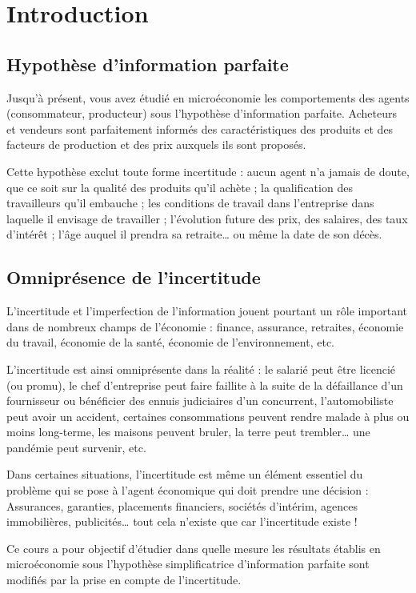 \documentclass[a4paper, 12pt]{report}
\begin{document}
	\chapter*{Introduction}
	
\section{Hypothèse d'information parfaite}

Jusqu'à présent, vous avez étudié en microéconomie les comportements des agents (consommateur, producteur) sous l'hypothèse d'information parfaite. Acheteurs et vendeurs sont parfaitement informés des caractéristiques des produits et des facteurs de production et des prix auxquels ils sont proposés. 

Cette hypothèse exclut toute forme incertitude : aucun agent n'a jamais de doute, que ce soit sur la qualité des produits qu'il achète ; la qualification des travailleurs qu'il
embauche ; les conditions de travail dans l'entreprise dans laquelle il envisage de travailler ; l'évolution future des prix, des salaires, des taux d'intérêt ; l'âge auquel il prendra sa retraite… ou même la date de son décès. 

\section{Omniprésence de l'incertitude}

L'incertitude et l'imperfection de l'information jouent pourtant un rôle important dans de nombreux champs de l’économie : finance, assurance, retraites, économie du travail, économie de la santé, économie de l’environnement, etc.

L'incertitude est ainsi omniprésente dans la réalité : le salarié peut être licencié (ou promu), le chef d'entreprise peut faire faillite à la suite de la défaillance d'un fournisseur ou bénéficier des ennuis judiciaires d'un concurrent, l'automobiliste peut avoir un accident, certaines consommations peuvent rendre malade à plus ou moins long-terme, les maisons peuvent bruler, la terre peut trembler… une pandémie peut survenir, etc.

Dans certaines situations, l'incertitude est même un élément essentiel du problème qui se pose à l'agent économique qui doit prendre une décision : Assurances, garanties, placements financiers, sociétés d'intérim, agences immobilières, publicités… tout cela n'existe que car l'incertitude existe !

Ce cours a pour objectif d’étudier dans quelle mesure les résultats établis en microéconomie sous l'hypothèse simplificatrice d’information parfaite sont modifiés par la prise en compte de l'incertitude.
\end{document}

